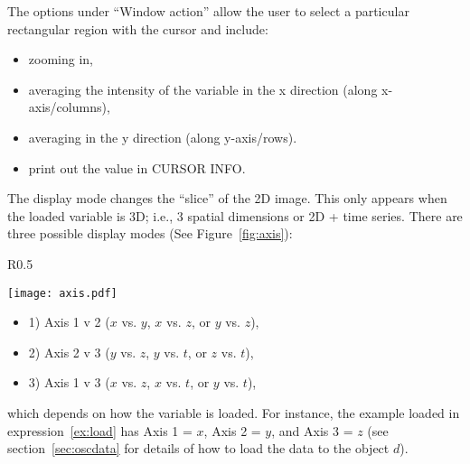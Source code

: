 \documentclass[12pt,preprint]{aastex}
\begin{document}
The options under ``Window action'' allow the user to select a particular rectangular region with the cursor and include: 

\begin{itemize}
\item zooming in,
\item averaging the intensity of the variable in the x direction (along x-axis/columns), 
\item averaging in the y direction (along y-axis/rows). 
\item print out the value in CURSOR INFO. 
\end{itemize}

The display mode changes the ``slice'' of the 2D image.  This only appears when the loaded 
variable is 3D; i.e., 3 spatial dimensions or 2D + time series. There are three possible display modes
(See Figure~\ref{fig:axis}): 

\begin{wrapfigure}{R}{0.5\textwidth}
\vspace{-1.5cm}
\begin{center}
	\texttt{[image: axis.pdf]}
\end{center}
\vspace{-0.56cm}
\caption{\label{fig:axis} Screenshot of the display mode options.}
\vspace{-1.cm}
\end{wrapfigure}

\begin{itemize}
\item 1) Axis 1 v 2 ($x$ vs. $y$, $x$ vs. $z$, or $y$ vs. $z$), 
\item 2) Axis 2 v 3 ($y$ vs. $z$, $y$ vs. $t$, or $z$ vs. $t$), 
\item 3) Axis 1 v 3 ($x$ vs. $z$, $x$ vs. $t$, or $y$ vs. $t$), 
\end{itemize}
which depends on how the variable is loaded. For instance, the example loaded in  
expression~\ref{ex:load} has Axis 1 = $x$, Axis 2 = $y$, and Axis 3 = $z$ (see section~\ref{sec:oscdata}
for details of how to load the data to the object $d$).

\end{document}

